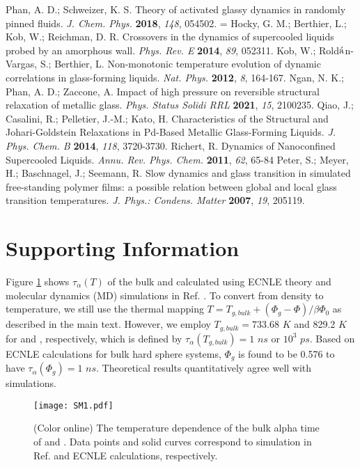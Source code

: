 \documentclass[twocolumn,preprintnumbers,amsmath,amssymb,superscriptaddress]{revtex4}
\begin{document}
\begin{thebibliography}{5}
 Phan, A. D.; Schweizer, K. S. Theory of activated glassy dynamics in randomly pinned fluids. \emph{J. Chem. Phys.} {\bf 2018}, \emph{148}, 054502.
= Hocky, G. M.; Berthier, L.; Kob, W.; Reichman, D. R. Crossovers in the dynamics of supercooled liquids probed by an amorphous wall. \emph{Phys. Rev. E} {\bf 2014}, \emph{89}, 052311.
 Kob, W.; Rold$\ce{\acute{a}}$n-Vargas, S.; Berthier, L. Non-monotonic temperature evolution of dynamic correlations in glass-forming liquids. \emph{Nat. Phys.} {\bf 2012}, \emph{8}, 164-167.
 Ngan, N. K.; Phan, A. D.; Zaccone, A. Impact of high pressure on reversible structural relaxation of metallic glass. \emph{Phys. Status Solidi RRL} {\bf 2021}, \emph{15}, 2100235.
 Qiao, J.; Casalini, R.; Pelletier, J.-M.; Kato, H. Characteristics of the Structural and Johari-Goldstein Relaxations in Pd-Based Metallic Glass-Forming Liquids. \emph{J. Phys. Chem. B} {\bf 2014}, \emph{118}, 3720-3730.
 Richert, R. Dynamics of Nanoconfined Supercooled Liquids. \emph{Annu. Rev. Phys. Chem.} {\bf 2011}, \emph{62}, 65-84
 Peter, S.; Meyer, H.; Baschnagel, J.; Seemann, R. Slow dynamics and glass transition in simulated free-standing polymer films: a possible relation between global and local glass transition temperatures. \emph{J. Phys.: Condens. Matter} {\bf 2007}, \emph{19}, 205119.
\end{thebibliography}

\section*{Supporting Information}
Figure \ref{fig:SM1} shows $\tau_\alpha(T)$ of the bulk  and  calculated using ECNLE theory and molecular dynamics (MD) simulations in Ref. \cite{14}. To convert from density to temperature, we still use the thermal mapping $T = T_{g,bulk} + (\Phi_g-\Phi)/\beta\Phi_0$ as described in the main text. However, we employ $T_{g,bulk} = 733.68$ $K$ and 829.2 $K$ for  and , respectively, which is defined by $\tau_\alpha(T_{g,bulk})=1$ $ns$ or $10^3$ $ps$. Based on ECNLE calculations for bulk hard sphere systems, $\Phi_g$ is found to be 0.576 to have $\tau_\alpha(\Phi_g)=1$ $ns$. Theoretical results quantitatively agree well with simulations. 

\begin{figure}[htp]
\texttt{[image: SM1.pdf]}
\caption{\label{fig:SM1}(Color online) The temperature dependence of the bulk alpha time of  and . Data points and solid curves correspond to simulation in Ref.\cite{14} and ECNLE calculations, respectively.}
\end{figure}
\end{document}
